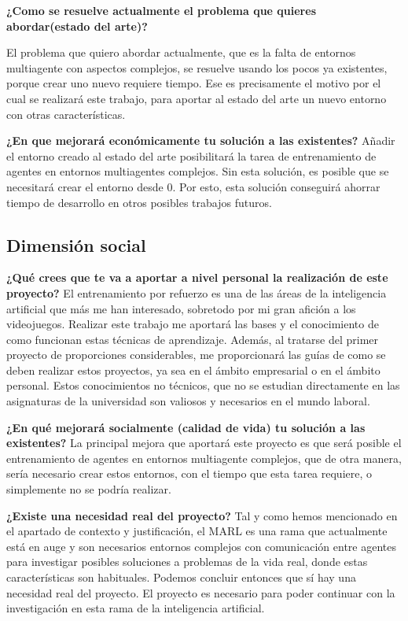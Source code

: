 \textbf{¿Como se resuelve actualmente el problema que quieres abordar(estado del arte)?}

El problema que quiero abordar actualmente, que es la falta de entornos multiagente con aspectos complejos, se resuelve usando los pocos ya existentes, porque crear uno nuevo requiere tiempo. Ese es precisamente el motivo por el cual se realizará este trabajo, para aportar al estado del arte un nuevo entorno con otras características.  

\textbf{¿En que mejorará económicamente tu solución a las existentes?}
Añadir el entorno creado al estado del arte posibilitará la tarea de entrenamiento de agentes en entornos multiagentes complejos. Sin esta solución, es posible que se necesitará crear el entorno desde 0. Por esto, esta solución conseguirá ahorrar tiempo de desarrollo en otros posibles trabajos futuros. 

\subsection{Dimensión social}

\textbf{¿Qué crees que te va a aportar a nivel personal la realización de este proyecto?}
El entrenamiento por refuerzo es una de las áreas de la inteligencia artificial que más me han interesado, sobretodo por mi gran afición a los videojuegos. Realizar este trabajo me aportará las bases y el conocimiento de como funcionan estas técnicas de aprendizaje. Además, al tratarse del primer proyecto de proporciones considerables, me proporcionará las guías de como se deben realizar estos proyectos, ya sea en el ámbito empresarial o en el ámbito personal. Estos conocimientos no técnicos, que no se estudian directamente en las asignaturas de la universidad son valiosos y necesarios en el mundo laboral.  

\textbf{¿En qué mejorará socialmente (calidad de vida) tu solución a las existentes?}
La principal mejora que aportará este proyecto es que será posible el entrenamiento de agentes en entornos multiagente complejos, que de otra manera, sería necesario crear estos entornos, con el tiempo que esta tarea requiere, o simplemente no se podría realizar.  

\textbf{¿Existe una necesidad real del proyecto?}
Tal y como hemos mencionado en el apartado de contexto y justificación, el MARL es una rama que actualmente está en auge y son necesarios entornos complejos con comunicación entre agentes para investigar posibles soluciones a problemas de la vida real, donde estas características son habituales. Podemos concluir entonces que sí hay una necesidad real del proyecto. El proyecto es necesario para poder continuar con la investigación en esta rama de la inteligencia artificial.

